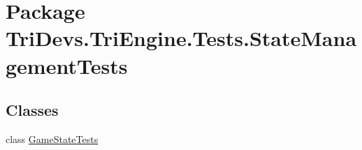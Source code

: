 \hypertarget{namespace_tri_devs_1_1_tri_engine_1_1_tests_1_1_state_management_tests}{\section{Package Tri\-Devs.\-Tri\-Engine.\-Tests.\-State\-Management\-Tests}
\label{namespace_tri_devs_1_1_tri_engine_1_1_tests_1_1_state_management_tests}
}
\subsection*{Classes}
\begin{DoxyCompactItemize}
\item 
class \hyperlink{class_tri_devs_1_1_tri_engine_1_1_tests_1_1_state_management_tests_1_1_game_state_tests}{Game\-State\-Tests}
\end{DoxyCompactItemize}
